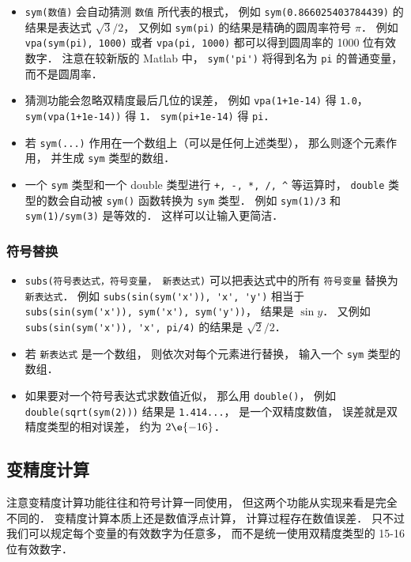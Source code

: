 \begin{itemize}
\item  \verb|sym(数值)| 会自动猜测 \verb|数值| 所代表的根式， 例如 \verb|sym(0.866025403784439)| 的结果是表达式 $\sqrt{3}/2$， 又例如 \verb|sym(pi)| 的结果是精确的圆周率符号 $\pi$． 例如 \verb|vpa(sym(pi), 1000)| 或者 \verb|vpa(pi, 1000)| 都可以得到圆周率的 1000 位有效数字． 注意在较新版的 Matlab 中， \verb|sym('pi')| 将得到名为 \verb|pi| 的普通变量， 而不是圆周率．

\item 猜测功能会忽略双精度最后几位的误差， 例如 \verb|vpa(1+1e-14)| 得 \verb|1.0|， \verb|sym(vpa(1+1e-14))| 得 \verb|1|． \verb|sym(pi+1e-14)| 得 \verb|pi|．

\item 若 \verb|sym(...)| 作用在一个数组上（可以是任何上述类型）， 那么则逐个元素作用， 并生成 \verb|sym| 类型的数组．

\item 一个 \verb|sym| 类型和一个 double 类型进行 \verb|+, -, *, /, ^| 等运算时， \verb|double| 类型的数会自动被 \verb|sym()| 函数转换为 \verb|sym| 类型． 例如 \verb|sym(1)/3| 和 \verb|sym(1)/sym(3)| 是等效的． 这样可以让输入更简洁．
\end{itemize}

\subsubsection{符号替换}
\begin{itemize}
\item \verb|subs(符号表达式，符号变量， 新表达式)| 可以把表达式中的所有 \verb|符号变量| 替换为 \verb|新表达式|． 例如 \verb|subs(sin(sym('x')), 'x', 'y')| 相当于 \verb|subs(sin(sym('x')), sym('x'), sym('y'))|， 结果是 $\sin y$． 又例如 \verb|subs(sin(sym('x')), 'x', pi/4)| 的结果是 $\sqrt 2/2$．
\item 若 \verb|新表达式| 是一个数组， 则依次对每个元素进行替换， 输入一个 \verb|sym| 类型的数组．
\item 如果要对一个符号表达式求数值近似， 那么用 \verb|double()|， 例如 \verb|double(sqrt(sym(2)))| 结果是 \verb|1.414...|， 是一个双精度数值， 误差就是双精度类型的相对误差， 约为 $2\e{-16}$．
\end{itemize}

\subsection{变精度计算}
注意变精度计算功能往往和符号计算一同使用， 但这两个功能从实现来看是完全不同的． 变精度计算本质上还是数值浮点计算， 计算过程存在数值误差． 只不过我们可以规定每个变量的有效数字为任意多， 而不是统一使用双精度类型的 15-16 位有效数字．

